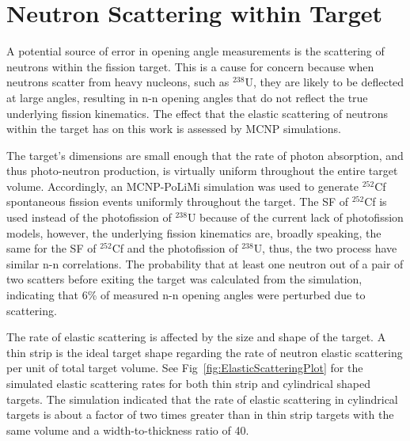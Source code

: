 \section{Neutron Scattering within Target}
\label{subsection:Elastic_scattering}
A potential source of error in opening angle measurements is the scattering of neutrons within the fission target.
This is a cause for concern because when neutrons scatter from heavy nucleons, such as $^{238}$U, they are likely to be deflected at large angles, resulting in n-n opening angles that do not reflect the true underlying fission kinematics.
The effect that the elastic scattering of neutrons within the target has on this work is assessed by MCNP simulations.

The target's dimensions are small enough that the rate of photon absorption, and thus photo-neutron production, is virtually uniform throughout the entire target volume.
Accordingly, an MCNP-PoLiMi simulation was used to generate $^{252}$Cf spontaneous fission events uniformly throughout the target.
The SF of $^{252}$Cf is used instead of the photofission of $^{238}$U because of the current lack of photofission models, however, the underlying fission kinematics are, broadly speaking, the same for the SF of $^{252}$Cf and the photofission of $^{238}$U, thus, the two process have similar n-n correlations.
The probability that at least one neutron out of a pair of two scatters before exiting the target was calculated from the simulation, indicating that 6\% of measured n-n opening angles were perturbed due to scattering.

The rate of elastic scattering is affected by the size and shape of the target.
A thin strip is the ideal target shape regarding the rate of neutron elastic scattering per unit of total target volume.
See Fig~\ref{fig:ElasticScatteringPlot} for the simulated elastic scattering rates for both thin strip and cylindrical shaped targets.
The simulation indicated that the rate of elastic scattering in cylindrical targets is about a factor of two times greater than in thin strip targets with the same volume and a width-to-thickness ratio of 40.

